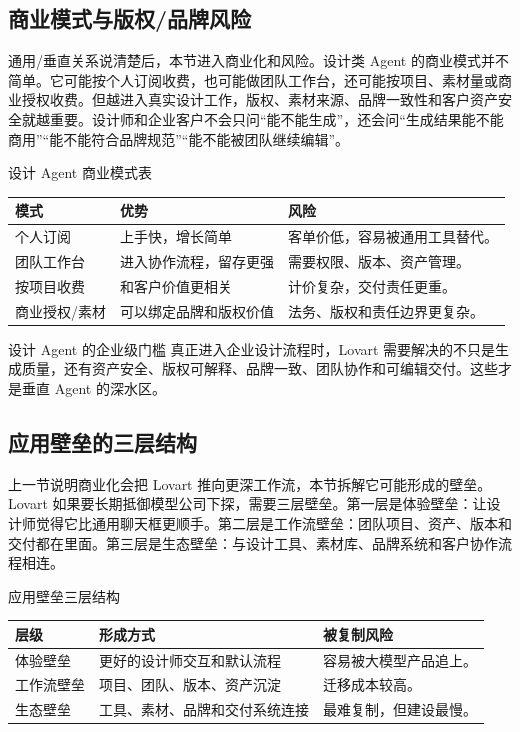 \subsection{商业模式与版权/品牌风险}

通用/垂直关系说清楚后，本节进入商业化和风险。设计类 Agent 的商业模式并不简单。它可能按个人订阅收费，也可能做团队工作台，还可能按项目、素材量或商业授权收费。但越进入真实设计工作，版权、素材来源、品牌一致性和客户资产安全就越重要。设计师和企业客户不会只问“能不能生成”，还会问“生成结果能不能商用”“能不能符合品牌规范”“能不能被团队继续编辑”。

\begin{knowledgebox}{设计 Agent 商业模式表}
\begin{tabularx}{\textwidth}{p{}p{}X}
\toprule
模式 & 优势 & 风险 \\
\midrule
个人订阅 & 上手快，增长简单 & 客单价低，容易被通用工具替代。 \\
团队工作台 & 进入协作流程，留存更强 & 需要权限、版本、资产管理。 \\
按项目收费 & 和客户价值更相关 & 计价复杂，交付责任更重。 \\
商业授权/素材 & 可以绑定品牌和版权价值 & 法务、版权和责任边界更复杂。 \\
\bottomrule
\end{tabularx}
\end{knowledgebox}

\begin{importantbox}{设计 Agent 的企业级门槛}
真正进入企业设计流程时，Lovart 需要解决的不只是生成质量，还有资产安全、版权可解释、品牌一致、团队协作和可编辑交付。这些才是垂直 Agent 的深水区。
\end{importantbox}

\subsection{应用壁垒的三层结构}

上一节说明商业化会把 Lovart 推向更深工作流，本节拆解它可能形成的壁垒。Lovart 如果要长期抵御模型公司下探，需要三层壁垒。第一层是体验壁垒：让设计师觉得它比通用聊天框更顺手。第二层是工作流壁垒：团队项目、资产、版本和交付都在里面。第三层是生态壁垒：与设计工具、素材库、品牌系统和客户协作流程相连。

\begin{knowledgebox}{应用壁垒三层结构}
\begin{tabularx}{\textwidth}{p{}p{}X}
\toprule
层级 & 形成方式 & 被复制风险 \\
\midrule
体验壁垒 & 更好的设计师交互和默认流程 & 容易被大模型产品追上。 \\
工作流壁垒 & 项目、团队、版本、资产沉淀 & 迁移成本较高。 \\
生态壁垒 & 工具、素材、品牌和交付系统连接 & 最难复制，但建设最慢。 \\
\bottomrule
\end{tabularx}
\end{knowledgebox}


